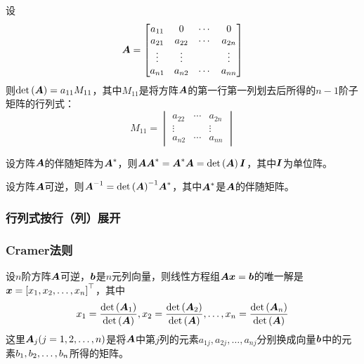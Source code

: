 \documentclass{ctexart}
\begin{document}
\begin{lemma}
    设
    \begin{equation*}
        \boldsymbol{A}=\begin{bmatrix}
            a_{11} & 0      & \cdots & 0      \\
            a_{21} & a_{22} & \cdots & a_{2n} \\
            \vdots & \vdots &        & \vdots \\
            a_{n1} & a_{n2} & \cdots & a_{nn}
        \end{bmatrix}
    \end{equation*}
    则\(\mathrm{det}\left( \boldsymbol{A} \right)=a_{11}M_{11}\)，其中\(M_{11}\)是将方阵\(\boldsymbol{A}\)的第一行第一列划去后所得的\(n-1\)阶子矩阵的行列式：
    \begin{equation*}
        M_{11}=\begin{vmatrix}
            a_{22} & \cdots & a_{2n} \\
            \vdots &        & \vdots \\
            a_{n2} & \cdots & a_{nn}
        \end{vmatrix}
    \end{equation*}
\end{lemma}

\begin{theorem}
    设方阵\(\boldsymbol{A}\)的伴随矩阵为\(\boldsymbol{A}^*\)，则\(\boldsymbol{A}\boldsymbol{A}^*=\boldsymbol{A}^*\boldsymbol{A}=\mathrm{det}\left( \boldsymbol{A} \right)\boldsymbol{I}\)，其中\(\boldsymbol{I}\)为单位阵。
\end{theorem}

\begin{infer}
    设方阵\(\boldsymbol{A}\)可逆，则\({\boldsymbol{A}}^{-1}={\mathrm{det}\left( \boldsymbol{A} \right)}^{-1}\boldsymbol{A}^*\)，其中\(\boldsymbol{A}^*\)是\(\boldsymbol{A}\)的伴随矩阵。
\end{infer}

\subsubsection*{行列式按行（列）展开}

\subsubsection*{Cramer法则}

\begin{theorem}[Cramer法则]
    设\(n\)阶方阵\(\boldsymbol{A}\)可逆，\(\boldsymbol{b}\)是\(n\)元列向量，则线性方程组\(\boldsymbol{A}\boldsymbol{x}=\boldsymbol{b}\)的唯一解是\(\boldsymbol{x}=\left[ {x}_1,{x}_2,\dots,{x}_{n} \right]^\top\)，其中
    \begin{equation*}
        x_1=\frac{\mathrm{det}\left( \boldsymbol{A}_1 \right)}{\mathrm{det}\left( \boldsymbol{A} \right)},x_2=\frac{\mathrm{det}\left( \boldsymbol{A}_2 \right)}{\mathrm{det}\left( \boldsymbol{A} \right)},\dots,x_n=\frac{\mathrm{det}\left( \boldsymbol{A}_n \right)}{\mathrm{det}\left( \boldsymbol{A} \right)}
    \end{equation*}
    这里\(\boldsymbol{A}_j(j=1,2,\dots,n)\)是将\(\boldsymbol{A}\)中第\(j\)列的元素\(a_{1j},a_{2j},\dots,a_{nj}\)分别换成向量\(\boldsymbol{b}\)中的元素\({b}_1,{b}_2,\dots,{b}_{n}\)所得的矩阵。
\end{theorem}
\end{document}
